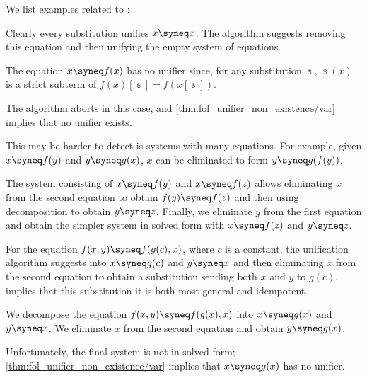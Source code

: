 \begin{example}\label{ex:alg:first_order_unification}
  We list examples related to :
  \begin{thmenum}
     Clearly every substitution unifies \( x \syneq x \). The algorithm suggests removing this equation and then unifying the empty system of equations.

     The equation \( x \syneq f(x) \) has no unifier since, for any substitution \( \Bbbs \), \( \Bbbs(x) \) is a strict subterm of \( f(x)[\Bbbs] = f(x[\Bbbs]) \).

    The algorithm aborts in this case, and \cref{thm:fol_unifier_non_existence/var} implies that no unifier exists.

    This may be harder to detect is systems with many equations. For example, given \( x \syneq f(y) \) and \( y \syneq g(x) \), \( x \) can be eliminated to form \( y \syneq g(f(y)) \).

     The system consisting of \( x \syneq f(y) \) and \( x \syneq f(z) \) allows eliminating \( x \) from the second equation to obtain \( f(y) \syneq f(z) \) and then using decomposition to obtain \( y \syneq z \). Finally, we eliminate \( y \) from the first equation and obtain the simpler system in solved form with \( x \syneq f(z) \) and \( y \syneq z \).

     For the equation \( f(x, y) \syneq f(g(c), x) \), where \( c \) is a constant, the unification algorithm suggests into \( x \syneq g(c) \) and \( y \syneq x \) and then eliminating \( x \) from the second equation to obtain a substitution sending both \( x \) and \( y \) to \( g(c) \).  implies that this substitution it is both most general and idempotent.

     We decompose the equation \( f(x, y) \syneq f(g(x), x) \) into \( x \syneq g(x) \) and \( y \syneq x \). We eliminate \( x \) from the second equation and obtain \( y \syneq g(x) \).

    Unfortunately, the final system is not in solved form; \cref{thm:fol_unifier_non_existence/var} implies that \( x \syneq g(x) \) has no unifier.


\end{thmenum}
\end{example}
